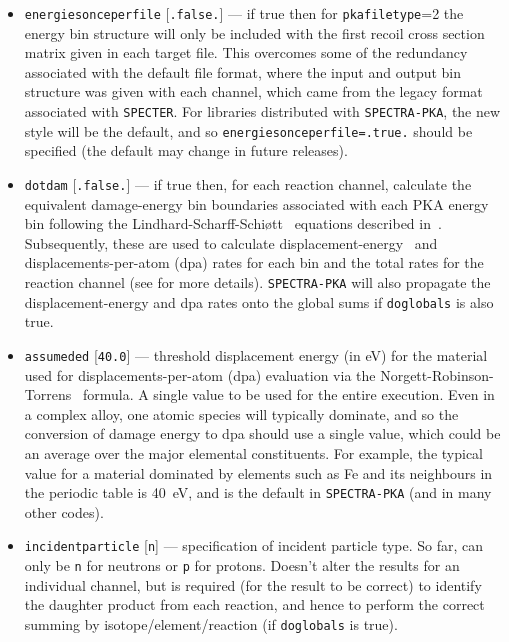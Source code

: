 \documentclass[a4paper]{article}
\begin{document}
\begin{itemize}
\item \texttt{energies{\textunderscore}once{\textunderscore}perfile} [\texttt{.false.}] --- if true then for   \texttt{pka{\textunderscore}filetype}=2 the energy bin structure will only be included with the first recoil cross section matrix given in each target file. This overcomes some of the redundancy associated with the default file format, where the input and output bin structure was given with each channel, which came from the legacy format associated with \texttt{SPECTER}. For libraries distributed with \texttt{SPECTRA-PKA}, the new style will be the default, and so \texttt{energies{\textunderscore}once{\textunderscore}perfile=.true.} should be specified (the default may change in future releases).
\item \texttt{do{\textunderscore}tdam} [\texttt{.false.}] --- if true then, for each reaction channel, calculate the equivalent damage-energy bin boundaries associated with each PKA energy bin following the Lindhard-Scharff-Schi{\o}tt~\cite{lindardetal1963a} equations described in~\cite{gilbertsublet2018,robinson1994}. Subsequently, these are used to calculate displacement-energy~\cite{AdrychBrunning2018} and displacements-per-atom (dpa) rates for each bin and the total rates for the reaction channel (see \cite{gilbertsublet2018} for more details). \texttt{SPECTRA-PKA} will also propagate the displacement-energy and dpa rates onto the global sums if \texttt{do{\textunderscore}globals} is also true.
\item \texttt{assumed{\textunderscore}ed} [\texttt{40.0}] --- threshold displacement energy (in eV) for the material used for displacements-per-atom (dpa) evaluation via the Norgett-Robinson-Torrens~\cite{norgettetal1975} formula. A single value to be used for the entire execution. Even in a complex alloy, one atomic species will typically dominate, and so the conversion of damage energy to dpa should use a single value, which could be an average over the major elemental constituents. For example, the typical value for a material dominated by elements such as Fe and its neighbours in the periodic table is 40~eV, and is the default in \texttt{SPECTRA-PKA} (and in many other codes).
\item \texttt{incident{\textunderscore}particle} [\texttt{n}] --- specification of incident particle type. So far, can only be \texttt{n} for neutrons or \texttt{p} for protons. Doesn't alter the results for an individual channel, but is required (for the result to be correct) to identify the daughter product from each reaction, and hence to perform the correct summing by isotope/element/reaction (if \texttt{do{\textunderscore}globals} is true).

\end{itemize}
\end{document}
